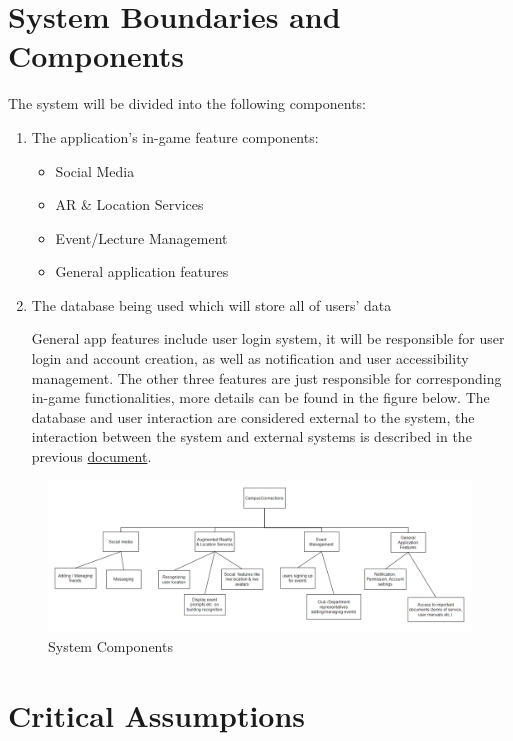\documentclass{article}
\begin{document}
\section{System Boundaries and Components}
The system will be divided into the following components:
\begin{enumerate}
	\item The application's in-game feature components:
	      \begin{itemize}
		      \item Social Media
		      \item AR \& Location Services
		      \item Event/Lecture Management
		      \item General application features
	      \end{itemize}
	\item The database being used which will store all of users' data
	
\quad General app features include user login system, it will be responsible for user login and account creation, as well as notification and user accessibility management. The other three features are just responsible for corresponding in-game functionalities, more details can be found in the figure below. The database and user interaction are considered external to the system, the interaction between the system and external systems is described in the previous \href{https://github.com/beatlepie/4G06CapstoneProjectTeam2/blob/docs-hazard-analysis/docs/SRS-Volere/SRS.pdf}{document}.
\end{enumerate}
\begin{figure}[H]
\begin{center}
\includegraphics[scale=0.7]{components.png}
\end{center}
\caption{System Components}
\end{figure}
\section{Critical Assumptions}
\end{document}
